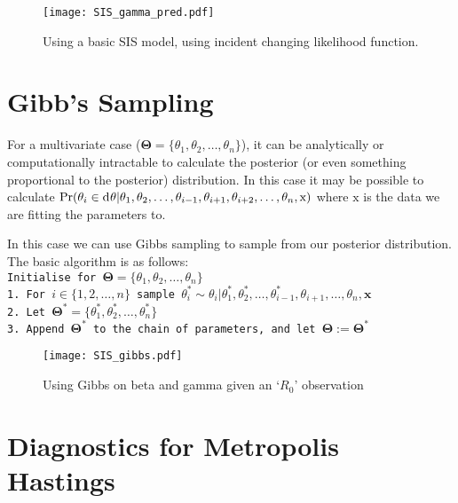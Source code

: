 \begin{figure}[htbp]
    \centering
    \texttt{[image: SIS\_gamma\_pred.pdf]}
    \caption{Using a basic SIS model, using incident changing likelihood function.}
    \label{fig:SIS_MH_R}
\end{figure}

\section{Gibb's Sampling}

For a multivariate case ($\mathbf{\Theta} = \{\theta_1, \theta_2, \dots, \theta_n\}$), it can be analytically or computationally intractable to calculate the posterior (or even something proportional to the posterior) distribution. In this case it may be possible to calculate $\Pr(\theta_i\in\diff\theta|\theta_1, \theta_2, \dots, \theta_{i - 1}, \theta_{i+1}, \theta_{i+2}, \dots, \theta_n, \mathrm{x})$ where $\mathrm{x}$ is the data we are fitting the parameters to.

In this case we can use Gibbs sampling to sample from our posterior distribution. The basic algorithm is as follows:
\texttt{\\
    Initialise for $\mathbf{\Theta} = \{\theta_1, \theta_2, \dots, \theta_n\}$\\
    1. For $i\in\{1, 2, \dots, n\}$ sample $\theta_i^* \sim \theta_i|\theta_1^*, \theta_2^*, \dots, \theta_{i-1}^*, \theta_{i+1}, \dots, \theta_n, \mathbf{x}$\\
    2. Let $\mathbf{\Theta}^* = \{\theta_1^*, \theta_2^*, \dots, \theta_n^*\}$\\
    3. Append $\mathbf{\Theta}^*$ to the chain of parameters, and let $\mathbf{\Theta} := \mathbf{\Theta}^*$
}


\begin{figure}[htbp]
    \centering
    \texttt{[image: SIS\_gibbs.pdf]}
    \caption{Using Gibbs on beta and gamma given an `$R_0$' observation}
    \label{fig:gibbs_R}
\end{figure}

\section{Diagnostics for Metropolis Hastings}
